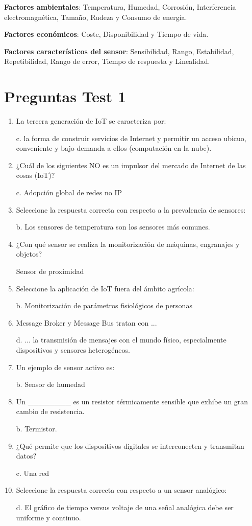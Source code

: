 \documentclass[12pt, twoside, openright]{report} %
\begin{document}
\textbf{Factores ambientales}: Temperatura, Humedad, Corrosión,
Interferencia electromagnética, Tamaño, Rudeza y Consumo de energía.

\textbf{Factores económicos}: Coste, Disponibilidad y Tiempo de vida.

\textbf{Factores característicos del sensor}: Sensibilidad, Rango,
Estabilidad, Repetibilidad, Rango de error, Tiempo de respuesta y
Linealidad.
\pagebreak
\section{Preguntas Test 1}
\begin{enumerate}
	\item La tercera generación de IoT se caracteriza por:

	      c. la forma de construir servicios de Internet y permitir un acceso ubicuo, conveniente y bajo demanda a ellos (computación en la nube).

	\item ¿Cuál de los siguientes NO es un impulsor del mercado de Internet de las cosas (IoT)?

	      c. Adopción global de redes no IP

	\item Seleccione la respuesta correcta con respecto a la prevalencia de sensores:

	      b. Los sensores de temperatura son los sensores más comunes.

	\item ¿Con qué sensor se realiza la monitorización de máquinas, engranajes y objetos?

	      Sensor de proximidad

	\item Seleccione la aplicación de IoT fuera del ámbito agrícola:

	      b. Monitorización de parámetros fisiológicos de personas

	\item Message Broker y Message Bus tratan con ...

	      d. ... la transmisión de mensajes con el mundo físico, especialmente dispositivos y sensores heterogéneos.

	\item Un ejemplo de sensor activo es:

	      b. Sensor de humedad

	\item Un \_\_\_\_\_\_\_\_ es un resistor térmicamente sensible que exhibe un gran cambio de resistencia.

	      b. Termistor.

	\item ¿Qué permite que los dispositivos digitales se interconecten y transmitan datos?

	      c. Una red

	\item Seleccione la respuesta correcta con respecto a un sensor analógico:

	      d. El gráfico de tiempo versus voltaje de una señal analógica debe ser uniforme y continuo.

\end{enumerate}
\end{document}
